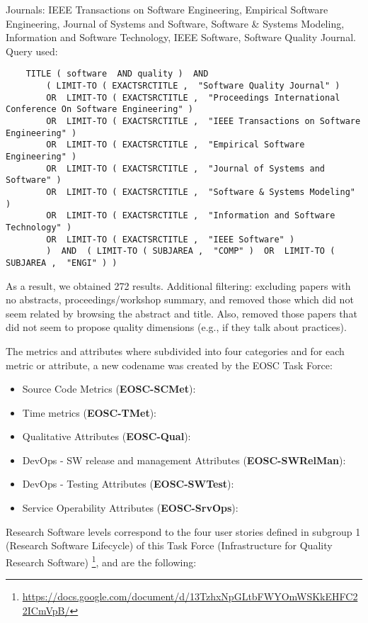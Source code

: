 \documentclass[a4paper]{article}
\begin{document}
Journals: IEEE Transactions on Software Engineering, Empirical Software Engineering, Journal of Systems and Software, Software \& Systems Modeling, 
Information and Software Technology, IEEE Software, Software Quality Journal. Query used:

\tiny
\begin{verbatim}
    TITLE ( software  AND quality )  AND  
        ( LIMIT-TO ( EXACTSRCTITLE ,  "Software Quality Journal" )  
        OR  LIMIT-TO ( EXACTSRCTITLE ,  "Proceedings International Conference On Software Engineering" ) 
        OR  LIMIT-TO ( EXACTSRCTITLE ,  "IEEE Transactions on Software Engineering" )
        OR  LIMIT-TO ( EXACTSRCTITLE ,  "Empirical Software Engineering" ) 
        OR  LIMIT-TO ( EXACTSRCTITLE ,  "Journal of Systems and Software" ) 
        OR  LIMIT-TO ( EXACTSRCTITLE ,  "Software & Systems Modeling" ) 
        OR  LIMIT-TO ( EXACTSRCTITLE ,  "Information and Software Technology" )  
        OR  LIMIT-TO ( EXACTSRCTITLE ,  "IEEE Software" )   
        )  AND  ( LIMIT-TO ( SUBJAREA ,  "COMP" )  OR  LIMIT-TO ( SUBJAREA ,  "ENGI" ) )  
\end{verbatim}
\small

As a result, we obtained 272 results. Additional filtering: excluding papers with no abstracts, proceedings/workshop summary,
and removed those which did not seem related by browsing the abstract and title. Also, removed those papers that did not seem to propose
quality dimensions (e.g., if they talk about practices).

The metrics and attributes where subdivided into four categories and for each metric or attribute,
a new codename was created by the EOSC Task Force:

\begin{itemize}
    \item Source Code Metrics (\textbf{EOSC-SCMet}):
    \item Time metrics (\textbf{EOSC-TMet}):
    \item Qualitative Attributes (\textbf{EOSC-Qual}):
    \item DevOps - SW release and management Attributes (\textbf{EOSC-SWRelMan}):
    \item DevOps - Testing Attributes (\textbf{EOSC-SWTest}):
    \item Service Operability Attributes (\textbf{EOSC-SrvOps}):
\end{itemize}

Research Software levels correspond to the four user stories defined in subgroup 1 (Research Software Lifecycle) of
this Task Force (Infrastructure for Quality Research Software) \footnote{\url{https://docs.google.com/document/d/13TzhxNpGLtbFWYOmWSKkEHFC22ICmVpB/}},
and are the following:
\end{document}
